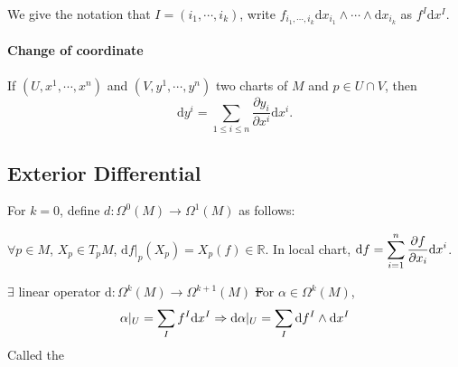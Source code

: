 
We give the notation that  $ I=\left(i_1,\cdots,i_k\right) $, write  $ f_{i_1,\cdots,i_k}\mathrm{d}x_{i_1}\wedge\cdots\wedge \mathrm{d}x_{i_k} $ as  $ f^I\mathrm{d}x^I $.
\paragraph{Change of coordinate} If  $ (U,x^1,\cdots,x^n) $ and  $ (V,y^1,\cdots,y^n)$ two charts of  $ M $ and  $ p\in U\cap V $, then
\begin{equation}
    \mathrm{d}y^i=\sum_{1 \leq i \leq n}\frac{\partial y_i}{\partial x^i}\mathrm{d}x^i.
\end{equation}
\subsection{Exterior Differential}
For  $ k=0 $, define  $ d:\Omega^0(M)\rightarrow \Omega^1(M) $ as follows:

$ \forall p\in M $,  $ X_p\in T_pM $,  $ \mathrm{d}f|_p(X_p)=X_p(f)\in \mathbb{R} $.
In local chart,  $ \mathrm{d}f=\displaystyle\sum_{i=1}^n\frac{\partial f}{\partial x_i}\mathrm{d}x^i $.
\begin{theorem}
    $ \exists $ linear operator  $ \mathrm{d}:\Omega^k(M)\rightarrow \Omega^{k+1}(M) $  \st
    For $ \alpha\in \Omega^k(M) $,
    \begin{equation}
        \alpha|_U=\displaystyle\sum_If^I\mathrm{d}x^I \Rightarrow \mathrm{d}\alpha|_U=\displaystyle\sum_{I}\mathrm{d}f^I\wedge\mathrm{d}x^I \label{eq:local coordinate of exterior differential}
    \end{equation}
    Called the 
\end{theorem}

